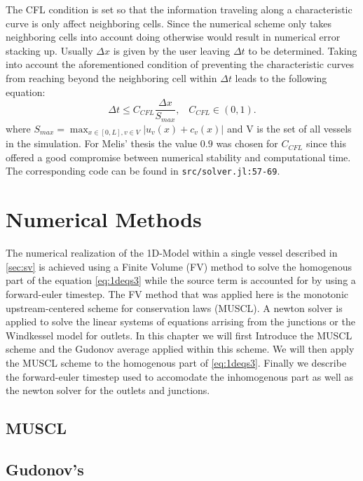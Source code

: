 \documentclass[a4paper, oneside]{discothesis}
\begin{document}
The CFL condition is set so that the information traveling along a characteristic curve is only affect neighboring cells. 
Since the numerical scheme only takes neighboring cells into account doing otherwise would result in numerical error stacking up.
Usually $\Delta x$ is given by the user leaving $\Delta t$ to be determined.
Taking into account the aforementioned condition of preventing the characteristic curves from reaching beyond the neighboring cell within $\Delta t$ leads to the following equation:
\begin{equation}
	\Delta t \leq C_{CFL} \frac{\Delta x}{S_{max}},\hspace{10pt}  C_{CFL} \in (0,1).
\end{equation}
where $S_{max} = \max_{x \in [0,L], v \in V} | u_v(x) + c_v(x) |$ and V is the set of all vessels in the simulation.  
For Melis' thesis the value $0.9$ was chosen for $C_{CFL}$ since this offered a good compromise between numerical stability and computational time.
The corresponding code can be found in \texttt{src/solver.jl:57-69}.



\chapter{Numerical Methods}
The numerical realization of the 1D-Model within a single vessel described in \autoref{sec:sv} is achieved using a Finite Volume (FV) method to solve the homogenous part of the equation \autoref{eq:1deqs3} while the source term is accounted for by using a forward-euler timestep. 
The FV method that was applied here is the monotonic upstream-centered scheme for conservation laws (MUSCL).
A newton solver is applied to solve the linear systems of equations arrising from the junctions or the Windkessel model for outlets.
In this chapter we will first Introduce the MUSCL scheme and the Gudonov average applied within this scheme.
We will then apply the MUSCL scheme to the homogenous part of \autoref{eq:1deqs3}.
Finally we describe the forward-euler timestep used to accomodate the inhomogenous part as well as the newton solver for the outlets and junctions.

\section{MUSCL}
\section{Gudonov's}
\end{document}
